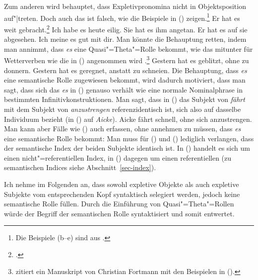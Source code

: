 %
Zum anderen wird behauptet, dass Expletivpronomina nicht in Objektsposition auf"|treten.
Doch auch das
ist falsch, wie die Beispiele in () zeigen.\footnote{
  Die Beispiele (b--e) sind aus .
}
\eal
\ex Er hat es weit gebracht.\footnote{
        .
}
\ex Ich habe es heute eilig.
\ex Sie hat es ihm angetan.
\ex Er hat es auf sie abgesehen.
\ex Ich meine es gut mit dir.
\zl
\largerpage
%
\noindent
Man könnte die Behauptung retten, indem man annimmt, dass \emph{es} eine
Quasi"=Theta"=Rolle bekommt, wie das mitunter für
Wetterverben wie die in () angenommen wird
  \citep[--327]{Chomsky93a}\nocite{Chomsky81a}.\footnote{ 
  \citet{Berman99a} zitiert ein Manuskript von Christian Fortmann 
  mit den Beispielen in ().%
}
\eal
\ex Gestern hat es geblitzt, ohne zu donnern.
\ex Gestern hat es geregnet, anstatt zu schneien.
\zl
Die Behauptung, dass \emph{es} eine semantische Rolle zugewiesen bekommt, wird dadurch
motiviert, dass man sagt, dass sich das \emph{es} in () genauso verhält wie eine
normale Nominalphrase in bestimmten Infinitivkonstruktionen.
Man sagt, dass in () das Subjekt von \emph{fährt} mit dem Subjekt von \emph{anzustrengen}
referenzidentisch ist, sich also auf dasselbe Individuum bezieht (in () auf \emph{Aicke}).
\ea
Aicke fährt schnell, ohne sich anzustrengen.
\z
Man kann aber Fälle wie () auch erfassen, ohne annehmen
zu müssen, dass \emph{es} eine semantische Rolle bekommt: Man muss für () und ()
lediglich verlangen, dass der semantische Index der beiden
Subjekte identisch ist. In () handelt es sich um einen
nicht"=referentiellen Index, in () dagegen um einen referentiellen 
(zu semantischen Indices siehe Abschnitt~\ref{sec-index}).

Ich nehme im Folgenden an, dass sowohl expletive Objekte als auch expletive Subjekte
vom entsprechenden Kopf syntaktisch selegiert werden, jedoch keine semantische Rolle füllen. 
Durch die Einführung von Quasi"=Theta"=Rollen würde der Begriff der semantischen Rolle 
syntaktisiert\label{page-syntaktisierung} und somit entwertet.

